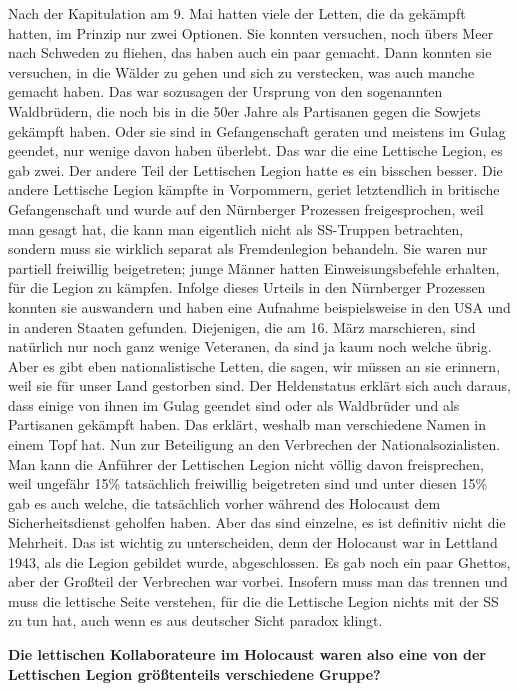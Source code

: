 Nach der Kapitulation am 9. Mai hatten viele der Letten, die da gekämpft hatten, im Prinzip nur zwei Optionen. Sie konnten versuchen, noch übers Meer nach Schweden zu fliehen, das haben auch ein paar gemacht. Dann konnten sie versuchen, in die Wälder zu gehen und sich zu verstecken, was auch manche gemacht haben. Das war sozusagen der Ursprung von den sogenannten Waldbrüdern, die noch bis in die 50er Jahre als Partisanen gegen die Sowjets gekämpft haben. Oder sie sind in Gefangenschaft geraten und meistens im Gulag geendet, nur wenige davon haben überlebt. 
Das war die eine Lettische Legion, es gab zwei. Der andere Teil der Lettischen Legion hatte es ein bisschen besser. Die andere Lettische Legion kämpfte in Vorpommern, geriet letztendlich in britische Gefangenschaft und wurde auf den Nürnberger Prozessen freigesprochen, weil man gesagt hat, die kann man eigentlich nicht als SS-Truppen betrachten, sondern muss sie wirklich separat als Fremdenlegion behandeln. Sie waren nur partiell freiwillig beigetreten; junge Männer hatten Einweisungsbefehle erhalten, für die Legion zu kämpfen. Infolge dieses Urteils in den Nürnberger Prozessen konnten sie auswandern und haben eine Aufnahme beispielsweise in den USA und in anderen Staaten gefunden. 
Diejenigen, die am 16. März marschieren, sind natürlich nur noch ganz wenige Veteranen, da sind ja kaum noch welche übrig. Aber es gibt eben nationalistische Letten, die sagen, wir müssen an sie erinnern, weil sie für unser Land gestorben sind. Der Heldenstatus erklärt sich auch daraus, dass einige von ihnen im Gulag geendet sind oder als Waldbrüder und als Partisanen gekämpft haben. Das erklärt, weshalb man verschiedene Namen in einem Topf hat. 
Nun zur Beteiligung an den Verbrechen der Nationalsozialisten. Man kann die Anführer der Lettischen Legion nicht völlig davon freisprechen, weil ungefähr 15\% tatsächlich freiwillig beigetreten sind und unter diesen 15\% gab es auch welche, die tatsächlich vorher während des Holocaust dem Sicherheitsdienst geholfen haben. Aber das sind einzelne, es ist definitiv nicht die Mehrheit. Das ist wichtig zu unterscheiden, denn der Holocaust war in Lettland 1943, als die Legion gebildet wurde, abgeschlossen. Es gab noch ein paar Ghettos, aber der Großteil der Verbrechen war vorbei. Insofern muss man das trennen und muss die lettische Seite verstehen, für die die Lettische Legion nichts mit der SS zu tun hat, auch wenn es aus deutscher Sicht paradox klingt. 

\textbf{Die lettischen Kollaborateure im Holocaust waren also eine von der Lettischen Legion größtenteils verschiedene Gruppe?} 

